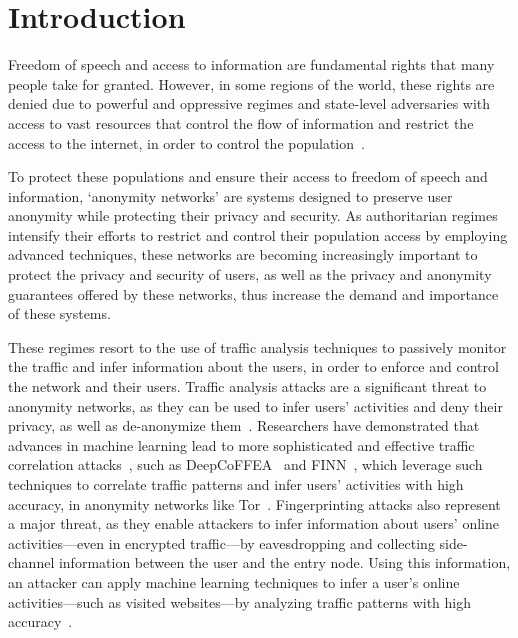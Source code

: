 
%

\chapter{Introduction}\label{cha:introduction}

Freedom of speech and access to information are fundamental rights that many people take for granted. However, in some regions of the world, these rights are denied due to powerful and oppressive regimes and state-level adversaries with access to vast resources that control the flow of information and restrict the access to the internet, in order to control the population~\cite*{aryan2013internet, zittrain2017shifting, alimardani2018internet}. 

To protect these populations and ensure their access to freedom of speech and information, `anonymity networks' are systems designed to preserve user anonymity while protecting their privacy and security. 
As authoritarian regimes intensify their efforts to restrict and control their population access by employing advanced techniques, these networks are becoming increasingly important to protect the privacy and security of users, as well as the privacy and anonymity guarantees offered by these networks, thus increase the demand and importance of these systems.

These regimes resort to the use of traffic analysis techniques to passively monitor the traffic and infer information about the users, in order to enforce and control the network and their users. 
Traffic analysis attacks are a significant threat to anonymity networks, as they can be used to infer users' activities and deny their privacy, as well as de-anonymize them~\cite*{chakravarty2014trafficanalysis, winter2012great, robjansen2019dosontor}.
Researchers have demonstrated that advances in machine learning lead to more sophisticated and effective traffic correlation attacks~\cite*{DeepCorr, TorMarker, TirDeanon}, such as DeepCoFFEA~\cite{DeepCoFFEA} and FINN~\cite{FINN}, which leverage such techniques to correlate traffic patterns and infer users' activities with high accuracy, in anonymity networks like Tor~\cite{johnson2013users}.
Fingerprinting attacks also represent a major threat, as they enable attackers to infer information about users' online activities—even in encrypted traffic—by eavesdropping and collecting side-channel information between the user and the entry node.
Using this information, an attacker can apply machine learning techniques to infer a user's online activities—such as visited websites—by analyzing traffic patterns with high accuracy~\cite*{DeepFingerprinting, TikTok, OnlineWebFingerprinting}.

